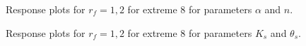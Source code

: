 \documentclass[review,times,3p,10pt]{elsarticle}
\begin{document}
\begin{figure}[htb!]
\label{ext6rf1-an2}
\caption{Response plots for $r_f=1,2$ for extreme 8 for parameters $\alpha$ and $n$.}
\end{figure}


\begin{figure}[htb!]
\label{ext6rf1-Kt2}
\caption{Response plots for $r_f=1,2$ for extreme 8 for parameters $K_s$ and $\theta_s$.}
\end{figure}
\end{document}
